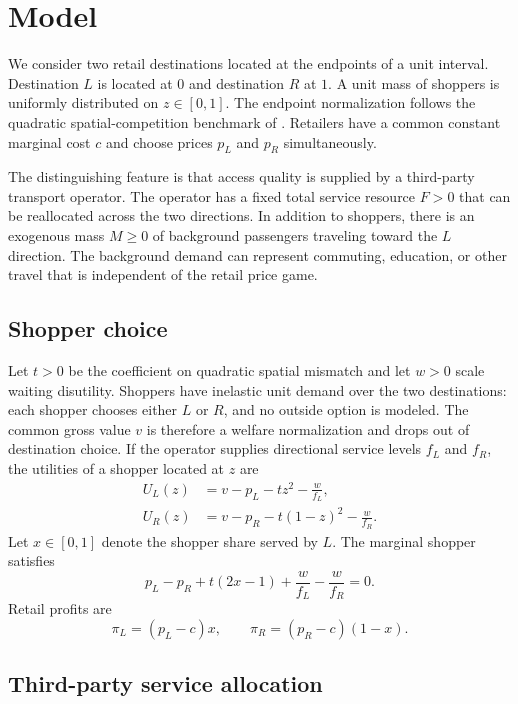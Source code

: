 \section{Model}\label{sec:model}

We consider two retail destinations located at the endpoints of a unit interval. Destination $L$ is located at $0$ and destination $R$ at $1$. A unit mass of shoppers is uniformly distributed on $z\in[0,1]$. The endpoint normalization follows the quadratic spatial-competition benchmark of \citet{daspremont1979}. Retailers have a common constant marginal cost $c$ and choose prices $p_L$ and $p_R$ simultaneously.

The distinguishing feature is that access quality is supplied by a third-party transport operator. The operator has a fixed total service resource $F>0$ that can be reallocated across the two directions. In addition to shoppers, there is an exogenous mass $M\geq0$ of background passengers traveling toward the $L$ direction. The background demand can represent commuting, education, or other travel that is independent of the retail price game.

\subsection{Shopper choice}

Let $t>0$ be the coefficient on quadratic spatial mismatch and let $w>0$ scale waiting disutility. Shoppers have inelastic unit demand over the two destinations: each shopper chooses either $L$ or $R$, and no outside option is modeled. The common gross value $v$ is therefore a welfare normalization and drops out of destination choice. If the operator supplies directional service levels $f_L$ and $f_R$, the utilities of a shopper located at $z$ are
\begin{align}
U_L(z)&=v-p_L-tz^2-\frac{w}{f_L},\\
U_R(z)&=v-p_R-t(1-z)^2-\frac{w}{f_R}.
\end{align}
Let $x\in[0,1]$ denote the shopper share served by $L$. The marginal shopper satisfies
\begin{equation}
 p_L-p_R+t(2x-1)+\frac{w}{f_L}-\frac{w}{f_R}=0.
 \label{eq:shopper_indifference_raw}
\end{equation}
Retail profits are
\begin{equation}
\pi_L=(p_L-c)x,
\qquad
\pi_R=(p_R-c)(1-x).
\label{eq:profits}
\end{equation}

\subsection{Third-party service allocation}

